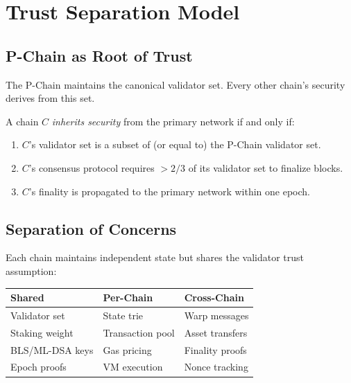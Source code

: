 \section{Trust Separation Model}


\subsection{P-Chain as Root of Trust}

The P-Chain maintains the canonical validator set. Every other chain's security derives from this set.

\begin{definition}
A chain $C$ \emph{inherits security} from the primary network if and only if:
\begin{enumerate}[leftmargin=2em]
\item $C$'s validator set is a subset of (or equal to) the P-Chain validator set.
\item $C$'s consensus protocol requires $>2/3$ of its validator set to finalize blocks.
\item $C$'s finality is propagated to the primary network within one epoch.
\end{enumerate}
\end{definition}

\subsection{Separation of Concerns}

Each chain maintains independent state but shares the validator trust assumption:

\begin{center}
\begin{tabular}{lll}
\toprule
\textbf{Shared} & \textbf{Per-Chain} & \textbf{Cross-Chain} \\
\midrule
Validator set & State trie & Warp messages \\
Staking weight & Transaction pool & Asset transfers \\
BLS/ML-DSA keys & Gas pricing & Finality proofs \\
Epoch proofs & VM execution & Nonce tracking \\
\bottomrule
\end{tabular}
\end{center}

